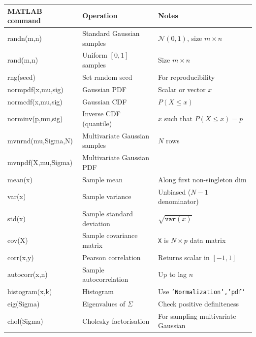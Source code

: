 \begin{center}
\renewcommand{\arraystretch}{1.35}
\begin{tabular}{>{\ttfamily\small}l >{\small}l >{\small}l}
\toprule
\normalfont\textbf{MATLAB command} & \textbf{Operation} &
\textbf{Notes} \\
\midrule
randn(m,n)           & Standard Gaussian samples     & $\mathcal{N}(0,1)$, size $m\times n$ \\
rand(m,n)            & Uniform $[0,1]$ samples       & Size $m\times n$ \\
rng(seed)            & Set random seed               & For reproducibility \\
normpdf(x,mu,sig)    & Gaussian PDF                  & Scalar or vector $x$ \\
normcdf(x,mu,sig)    & Gaussian CDF                  & $P(X\leq x)$ \\
norminv(p,mu,sig)    & Inverse CDF (quantile)        & $x$ such that $P(X\leq x)=p$ \\
mvnrnd(mu,Sigma,N)   & Multivariate Gaussian samples & $N$ rows \\
mvnpdf(X,mu,Sigma)   & Multivariate Gaussian PDF     & \\
mean(x)              & Sample mean                   & Along first non-singleton dim \\
var(x)               & Sample variance               & Unbiased ($N-1$ denominator) \\
std(x)               & Sample standard deviation     & $\sqrt{\texttt{var}(x)}$ \\
cov(X)               & Sample covariance matrix      & \texttt{X} is $N\times p$ data matrix \\
corr(x,y)            & Pearson correlation            & Returns scalar in $[-1,1]$ \\
autocorr(x,n)        & Sample autocorrelation         & Up to lag $n$ \\
histogram(x,k)       & Histogram                     & Use \texttt{'Normalization','pdf'} \\
eig(Sigma)           & Eigenvalues of $\Sigma$        & Check positive definiteness \\
chol(Sigma)          & Cholesky factorisation         & For sampling multivariate Gaussian \\
\bottomrule
\end{tabular}
\end{center}

